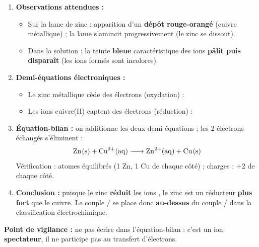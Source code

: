 \documentclass[11pt]{article}
\begin{document}
\begin{corrige}
\begin{enumerate}
    \item \textbf{Observations attendues :}
    \begin{itemize}
        \item Sur la lame de zinc : apparition d'un \textbf{dépôt rouge-orangé} (cuivre métallique) ; la lame s'amincit progressivement (le zinc se dissout).
        \item Dans la solution : la teinte \textbf{bleue} caractéristique des ions  \textbf{pâlit puis disparaît} (les ions  formés sont incolores).
    \end{itemize}
    \item \textbf{Demi-équations électroniques :}
    \begin{itemize}
        \item Le zinc métallique cède des électrons (oxydation) : 
        \item Les ions cuivre(II) captent des électrons (réduction) : 
    \end{itemize}
    \item \textbf{Équation-bilan :} on additionne les deux demi-équations ; les 2 électrons échangés s'éliminent :
    \[ \ce{Zn(s) + Cu^2+(aq) -> Zn^2+(aq) + Cu(s)} \]
    Vérification : atomes équilibrés (1 Zn, 1 Cu de chaque côté) ; charges : $+2$ de chaque côté.
    \item \textbf{Conclusion :} puisque le zinc \textbf{réduit} les ions , le zinc est un réducteur \textbf{plus fort} que le cuivre. Le couple / se place donc \textbf{au-dessus} du couple / dans la classification électrochimique.
\end{enumerate}
\textbf{Point de vigilance :} ne pas écrire  dans l'équation-bilan : c'est un ion \textbf{spectateur}, il ne participe pas au transfert d'électrons.
\end{corrige}
\end{document}
